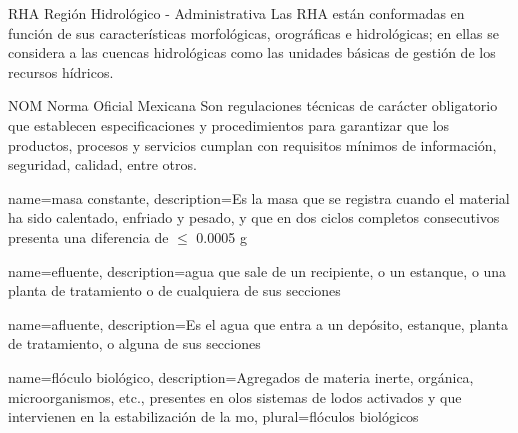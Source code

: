 	{RHA}
	{Región Hidrológico - Administrativa}
	{Las RHA están conformadas en función de sus características morfológicas, orográficas e hidrológicas; en ellas se considera a las cuencas hidrológicas como las unidades básicas de gestión de los recursos hídricos.}
	
	{NOM}
	{Norma Oficial Mexicana}
	{Son regulaciones técnicas de carácter obligatorio que establecen especificaciones y procedimientos para garantizar que los productos, procesos y servicios cumplan con requisitos mínimos de información, seguridad, calidad, entre otros.}

{
	name={masa constante},
	description={Es la masa que se registra cuando el material ha sido calentado, enfriado y pesado, y que en dos ciclos completos consecutivos presenta una diferencia de $\leq$ 0.0005 g}
}

{
	name={efluente},
	description={agua que sale de un recipiente, o un estanque, o una planta de tratamiento o de cualquiera de sus secciones}
}

{
	name=afluente,
	description={Es el agua que entra a un depósito, estanque, planta de tratamiento, o alguna de sus secciones}
}

{
	name={flóculo biológico},
	description={Agregados de materia inerte, orgánica, microorganismos, etc., presentes en olos sistemas de lodos activados y que intervienen en la estabilización de la \gls{mo}},
	plural={flóculos biológicos}
}




